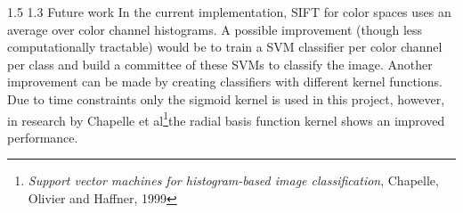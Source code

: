 \documentclass[12pt,a4paper]{amsart}
\makeatletter
\def\section{%
  \@startsection{section}{1}{\z@}%
  {1.5\linespacing\@plus\linespacing}%
  {1.3\linespacing}%
  {\bfseries\normalfont\scshape}
}
\makeatother
\begin{document}
\section{Future work}
In the current implementation, SIFT for color spaces uses an average over color channel histograms. A possible improvement (though less computationally tractable) would be to train a SVM classifier per color channel per class and build a committee of these SVMs to classify the image. Another improvement can be made by creating classifiers with different kernel functions. Due to time constraints only the sigmoid kernel is used in this project, however, in research by Chapelle et al\footnote{\textit{Support vector machines for histogram-based image classification}, Chapelle, Olivier and Haffner, 1999}the radial basis function kernel shows an improved performance.



\end{document}
